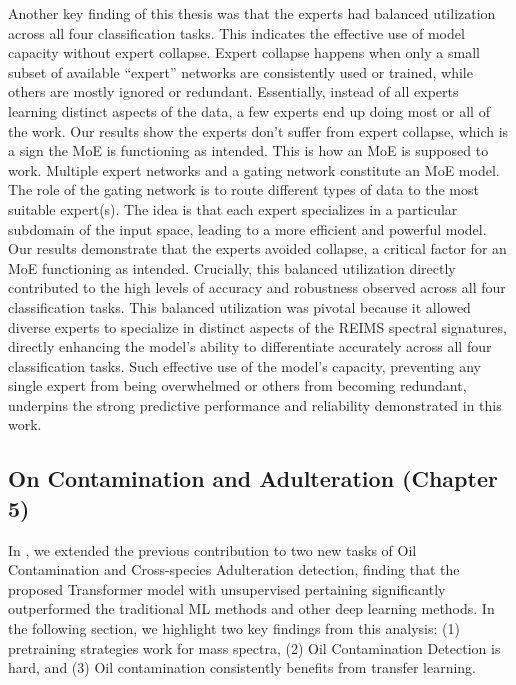 Another key finding of this thesis was that the experts had balanced utilization across all four classification tasks. This indicates the effective use of model capacity without expert collapse. Expert collapse happens when only a small subset of available ``expert'' networks are consistently used or trained, while others are mostly ignored or redundant. Essentially, instead of all experts learning distinct aspects of the data, a few experts end up doing most or all of the work. Our results show the experts don't suffer from expert collapse, which is a sign the MoE is functioning as intended. This is how an MoE is supposed to work. Multiple expert networks and a gating network constitute an MoE model. The role of the gating network is to route different types of data to the most suitable expert(s). The idea is that each expert specializes in a particular subdomain of the input space, leading to a more efficient and powerful model. Our results demonstrate that the experts avoided collapse, a critical factor for an MoE functioning as intended. Crucially, this balanced utilization directly contributed to the high levels of accuracy and robustness observed across all four classification tasks.
This balanced utilization was pivotal because it allowed diverse experts to specialize in distinct aspects of the REIMS spectral signatures, directly enhancing the model's ability to differentiate accurately across all four classification tasks. Such effective use of the model's capacity, preventing any single expert from being overwhelmed or others from becoming redundant, underpins the strong predictive performance and reliability demonstrated in this work.

\subsection{On Contamination and Adulteration (Chapter 5)}

In , we extended the previous contribution to two new tasks of Oil Contamination and Cross-species Adulteration detection, finding that the proposed Transformer model with unsupervised pertaining significantly outperformed the traditional ML methods and other deep learning methods. In the following section, we highlight two key findings from this analysis:
(1) pretraining strategies work for mass spectra,
(2) Oil Contamination Detection is hard,
and (3) Oil contamination consistently benefits from transfer learning.

